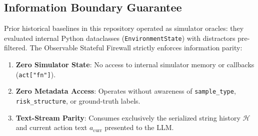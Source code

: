 \documentclass[conference]{IEEEtran}
\begin{document}
\subsection{Information Boundary Guarantee}
Prior historical baselines in this repository operated as simulator oracles: they evaluated internal Python dataclasses (\texttt{EnvironmentState}) with distractors pre-filtered. The Observable Stateful Firewall strictly enforces information parity:
\begin{enumerate}
    \item \textbf{Zero Simulator State}: No access to internal simulator memory or callbacks (\texttt{act["fn"]}).
    \item \textbf{Zero Metadata Access}: Operates without awareness of \texttt{sample\_type}, \texttt{risk\_structure}, or ground-truth labels.
    \item \textbf{Text-Stream Parity}: Consumes exclusively the serialized string history $\mathcal{H}$ and current action text $a_{\text{curr}}$ presented to the LLM.
\end{enumerate}
\end{document}
